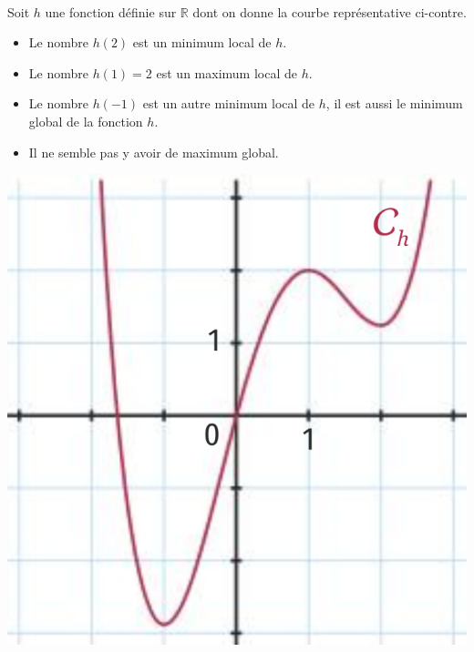 \documentclass[11pt]{article}
\begin{document}
\begin{exemple}~\\[-6mm]
  \begin{minipage}{.6\textwidth}
    Soit $h$ une fonction définie sur $\mathbb{R}$ dont on donne la courbe
    représentative ci-contre.
    \begin{itemize}
      \item Le nombre $h(2)$ est un minimum local de $h$.
      \item Le nombre $h(1)=2$ est un maximum local de $h$.
      \item Le nombre $h(-1)$ est un autre minimum local de $h$, il est aussi le
        minimum global de la fonction $h$.
      \item Il ne semble pas y avoir de maximum global.
    \end{itemize}
  \end{minipage}
  \begin{minipage}{.4\textwidth}
    \begin{center}
      \includegraphics[scale=.22]{extremum.png}
    \end{center}
  \end{minipage}
\end{exemple}
\end{document}
